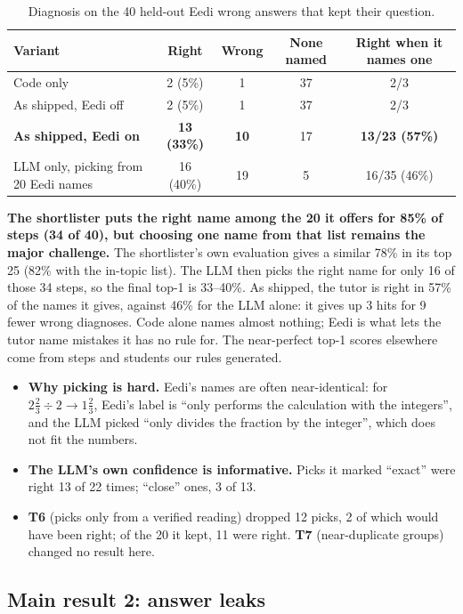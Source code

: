 \documentclass[11pt,a4paper]{article}
\newcommand{\best}[1]{\textbf{#1}}
\begin{document}
\begin{table}[H]
\centering\small
\begin{tabularx}{\linewidth}{@{}YCCCC@{}}
\toprule
Variant & Right & Wrong & None named & Right when it names one \\
\midrule
Code only & 2 (5\%) & 1 & 37 & 2/3 \\
As shipped, Eedi off & 2 (5\%) & 1 & 37 & 2/3 \\
\best{As shipped, Eedi on} & \best{13 (33\%)} & \best{10} & 17 & \best{13/23 (57\%)} \\
LLM only, picking from 20 Eedi names & 16 (40\%) & 19 & 5 & 16/35 (46\%) \\
\bottomrule
\end{tabularx}
\caption{Diagnosis on the 40 held-out Eedi wrong answers that kept their question.}
\label{tab:eedi}
\end{table}

\noindent\textbf{The shortlister puts the right name among the 20 it offers for 85\% of steps (34 of 40), but choosing one name from that list remains the major challenge.} The shortlister's own evaluation gives a similar 78\% in its top 25 (82\% with the in-topic list). The LLM then picks the right name for only 16 of those 34 steps, so the final top-1 is 33--40\%. As shipped, the tutor is right in 57\% of the names it gives, against 46\% for the LLM alone: it gives up 3 hits for 9 fewer wrong diagnoses. Code alone names almost nothing; Eedi is what lets the tutor name mistakes it has no rule for. The near-perfect top-1 scores elsewhere come from steps and students our rules generated.
\begin{itemize}
  \item \textbf{Why picking is hard.} Eedi's names are often near-identical: for $2\frac{2}{3} \div 2 \to 1\frac{2}{3}$, Eedi's label is ``only performs the calculation with the integers'', and the LLM picked ``only divides the fraction by the integer'', which does not fit the numbers.
  \item \textbf{The LLM's own confidence is informative.} Picks it marked ``exact'' were right 13 of 22 times; ``close'' ones, 3 of 13.
  \item \textbf{T6} (picks only from a verified reading) dropped 12 picks, 2 of which would have been right; of the 20 it kept, 11 were right. \textbf{T7} (near-duplicate groups) changed no result here.
\end{itemize}


\subsection{Main result 2: answer leaks}\label{sec:r2}
\end{document}
